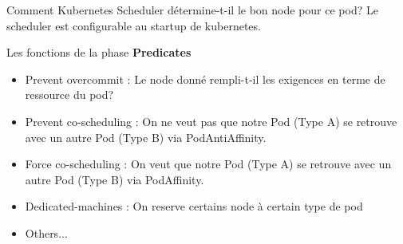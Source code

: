 \documentclass{bredelebeamer}
\begin{document}
\begin{frame}{Comment Kubernetes Scheduler détermine-t-il le bon node pour ce pod?}
Le scheduler est configurable au startup de kubernetes.
\begin{block}{Les fonctions de la phase \textbf{Predicates}}
\begin{itemize}
\item Prevent overcommit : Le node donné rempli-t-il les exigences en terme de ressource du pod?\\
\pause
\item Prevent co-scheduling : On ne veut pas que notre Pod (Type A) se retrouve avec un autre Pod (Type B) via PodAntiAffinity.\\
\pause
\item Force co-scheduling : On veut que notre Pod (Type A) se retrouve avec un autre Pod (Type B) via PodAffinity.
\pause
\item Dedicated-machines : On reserve certains node à certain type de pod
\item Others...
\end{itemize}
\end{block}
\end{frame}
\end{document}
